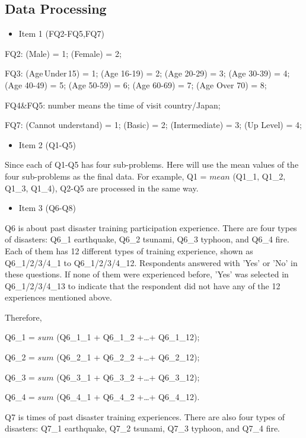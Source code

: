 \subsection{Data Processing}
\begin{itemize}
\item Item 1 (FQ2-FQ5,FQ7)
\end{itemize}

FQ2: (Male) = 1; (Female) = 2;

FQ3: (Age\,Under\,15) = 1; (Age 16-19) = 2; (Age 20-29) = 3; (Age 30-39) = 4; (Age 40-49) = 5; (Age 50-59) = 6; (Age 60-69) = 7; (Age Over 70) = 8;

FQ4\&FQ5: number means the time of visit country/Japan;

FQ7: (Cannot understand) = 1; (Basic) = 2; (Intermediate) = 3; (Up Level) = 4; 

\begin{itemize}
\item Item 2 (Q1-Q5)
\end{itemize}

Since each of Q1-Q5 has four sub-problems. Here will use the mean values of the four sub-problems as the final data. For example, Q1 = $mean$ (Q1\_1, Q1\_2, Q1\_3, Q1\_4), Q2-Q5 are processed in the same way.

\begin{itemize}
\item Item 3 (Q6-Q8)
\end{itemize}

Q6 is about past disaster training participation experience. There are four types of disasters: Q6\_1 earthquake, Q6\_2 tsunami, Q6\_3 typhoon, and Q6\_4 fire. Each of them has 12 different types of training experience, shown as Q6\_1/2/3/4\_1 to Q6\_1/2/3/4\_12. Respondents answered with 'Yes' or 'No' in these questions. If none of them were experienced before, 'Yes' was selected in Q6\_1/2/3/4\_13 to indicate that the respondent did not have any of the 12 experiences mentioned above. 

Therefore, 

Q6\_1 = $sum$ (Q6\_1\_1 + Q6\_1\_2 +\dots+ Q6\_1\_12);

Q6\_2 = $sum$ (Q6\_2\_1 + Q6\_2\_2 +\dots+ Q6\_2\_12);

Q6\_3 = $sum$ (Q6\_3\_1 + Q6\_3\_2 +\dots+ Q6\_3\_12);

Q6\_4 = $sum$ (Q6\_4\_1 + Q6\_4\_2 +\dots+ Q6\_4\_12).

Q7 is times of past disaster training experiences. There are also four types of disasters: Q7\_1 earthquake, Q7\_2 tsunami, Q7\_3 typhoon, and Q7\_4 fire.
 
